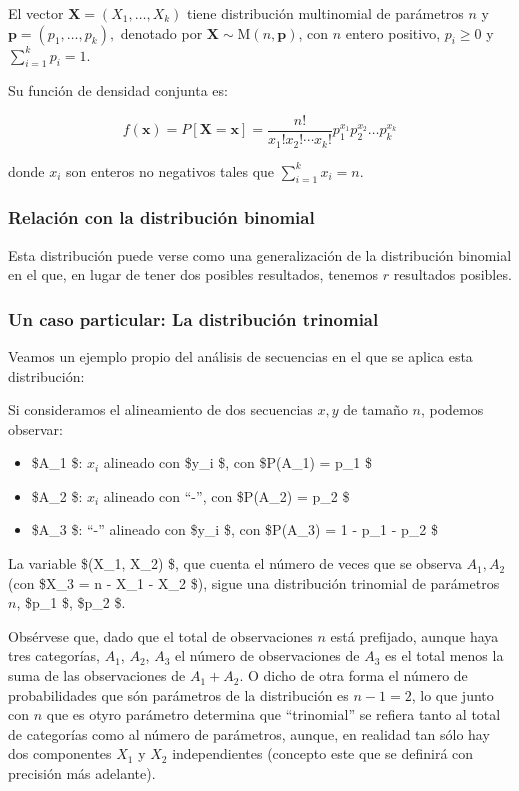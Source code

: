 \documentclass[
]{article}
\providecommand{\tightlist}{%
  \setlength{\itemsep}{0pt}\setlength{\parskip}{0pt}}
\begin{document}
El vector \(\mathbf{X} = (X_1, \dots, X_k)\) tiene distribución multinomial de parámetros \(n\) y \(\mathbf{p} = (p_1, \dots, p_k),\) denotado por \(\mathbf{X} \sim \mathrm{M}(n, \mathbf{p})\), con \(n\) entero positivo, \(p_i \geq 0\) y \(\sum_{i=1}^{k} p_i = 1\).

Su función de densidad conjunta es:

\[
f(\mathbf{x}) = P[\mathbf{X} = \mathbf{x}] = \frac{n!}{x_1!x_2!\cdots x_k!} p_1^{x_1} p_2^{x_2} \dots p_k^{x_k}
\]

donde \(x_i\) son enteros no negativos tales que \(\sum_{i=1}^{k} x_i = n\).

\subsubsection{Relación con la distribución binomial}\label{relaciuxf3n-con-la-distribuciuxf3n-binomial}

Esta distribución puede verse como una generalización de la distribución binomial en el que, en lugar de tener dos posibles resultados, tenemos \(r\) resultados posibles.

\subsubsection{Un caso particular: La distribución trinomial}\label{un-caso-particular-la-distribuciuxf3n-trinomial}

Veamos un ejemplo propio del análisis de secuencias en el que se aplica esta distribución:

Si consideramos el alineamiento de dos secuencias \(x, y\) de tamaño \(n\), podemos observar:

\begin{itemize}
\tightlist
\item
  \$A\_1 \$: \(x_i\) alineado con \$y\_i \$, con \$P(A\_1) = p\_1 \$
\item
  \$A\_2 \$: \(x_i\) alineado con ``-'', con \$P(A\_2) = p\_2 \$
\item
  \$A\_3 \$: ``-'' alineado con \$y\_i \$, con \$P(A\_3) = 1 - p\_1 - p\_2 \$
\end{itemize}

La variable \$(X\_1, X\_2) \$, que cuenta el número de veces que se observa \(A_1, A_2\) (con \$X\_3 = n - X\_1 - X\_2 \$), sigue una distribución trinomial de parámetros \(n\), \$p\_1 \$, \$p\_2 \$.

Obsérvese que, dado que el total de observaciones \(n\) está prefijado, aunque haya tres categorías, \(A_1\), \(A_2\), \(A_3\) el número de observaciones de \(A_3\) es el total menos la suma de las observaciones de \(A_1+A_2\). O dicho de otra forma el número de probabilidades que són parámetros de la distribución es \(n-1=2\), lo que junto con \(n\) que es otyro parámetro determina que ``trinomial'' se refiera tanto al total de categorías como al número de parámetros, aunque, en realidad tan sólo hay dos componentes \(X_1\) y \(X_2\) independientes (concepto este que se definirá con precisión más adelante).
\end{document}
